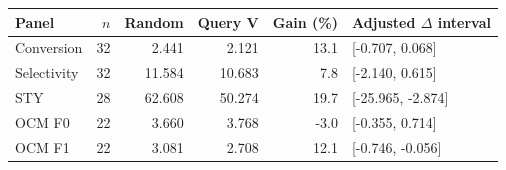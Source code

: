 \begin{tabular}{lrrrrl}\toprule Panel & $n$ & Random & Query V & Gain (\%) & Adjusted $\Delta$ interval\\\midrule
Conversion & 32 & 2.441 & 2.121 & 13.1 & [-0.707, 0.068]\\
Selectivity & 32 & 11.584 & 10.683 & 7.8 & [-2.140, 0.615]\\
STY & 28 & 62.608 & 50.274 & 19.7 & [-25.965, -2.874]\\
OCM F0 & 22 & 3.660 & 3.768 & -3.0 & [-0.355, 0.714]\\
OCM F1 & 22 & 3.081 & 2.708 & 12.1 & [-0.746, -0.056]\\
\bottomrule\end{tabular}
